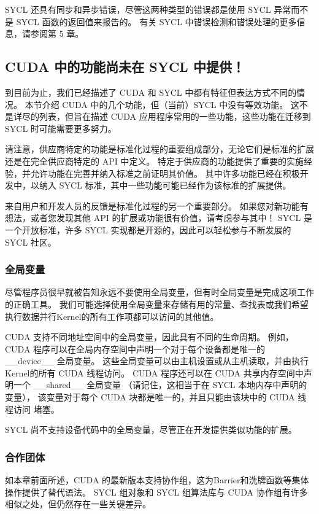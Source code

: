 SYCL 还具有同步和异步错误，尽管这两种类型的错误都是使用 SYCL 异常而不是 SYCL 函数的返回值来报告的。 
有关 SYCL 中错误检测和错误处理的更多信息，请参阅第 5 章。

\subsection{CUDA 中的功能尚未在 SYCL 中提供！}
到目前为止，我们已经描述了 CUDA 和 SYCL 中都有特征但表达方式不同的情况。 
本节介绍 CUDA 中的几个功能，但（当前）SYCL 中没有等效功能。 
这不是详尽的列表，但旨在描述 CUDA 应用程序常用的一些功能，这些功能在迁移到 SYCL 时可能需要更多努力。

请注意，供应商特定的功能是标准化过程的重要组成部分，无论它们是标准的扩展还是在完全供应商特定的 API 中定义。 
特定于供应商的功能提供了重要的实施经验，并允许功能在完善并纳入标准之前证明其价值。 
其中许多功能已经在积极开发中，以纳入 SYCL 标准，其中一些功能可能已经作为该标准的扩展提供。

\begin{remark}[参与进来！]
来自用户和开发人员的反馈是标准化过程的另一个重要部分。
如果您对新功能有想法，或者您发现其他 API 的扩展或功能很有价值，请考虑参与其中！
SYCL 是一个开放标准，许多 SYCL 实现都是开源的，因此可以轻松参与不断发展的 SYCL 社区。
\end{remark}

\subsubsection{全局变量}
尽管程序员很早就被告知永远不要使用全局变量，但有时全局变量是完成这项工作的正确工具。 
我们可能选择使用全局变量来存储有用的常量、查找表或我们希望执行数据并行Kernel的所有工作项都可以访问的其他值。

CUDA 支持不同地址空间中的全局变量，因此具有不同的生命周期。 
例如，CUDA 程序可以在全局内存空间中声明一个对于每个设备都是唯一的 \_\_device\_\_ 全局变量。 
这些全局变量可以由主机设置或从主机读取，并由执行Kernel的所有 CUDA 线程访问。 
CUDA 程序还可以在 CUDA 共享内存空间中声明一个 \_\_shared\_\_ 全局变量
（请记住，这相当于在 SYCL 本地内存中声明的变量），
该变量对于每个 CUDA 块都是唯一的，并且只能由该块中的 CUDA 线程访问 堵塞。

SYCL 尚不支持设备代码中的全局变量，尽管正在开发提供类似功能的扩展。

\subsubsection{合作团体}
如本章前面所述，CUDA 的最新版本支持协作组，这为Barrier和洗牌函数等集体操作提供了替代语法。 
SYCL 组对象和 SYCL 组算法库与 CUDA 协作组有许多相似之处，但仍然存在一些关键差异。

